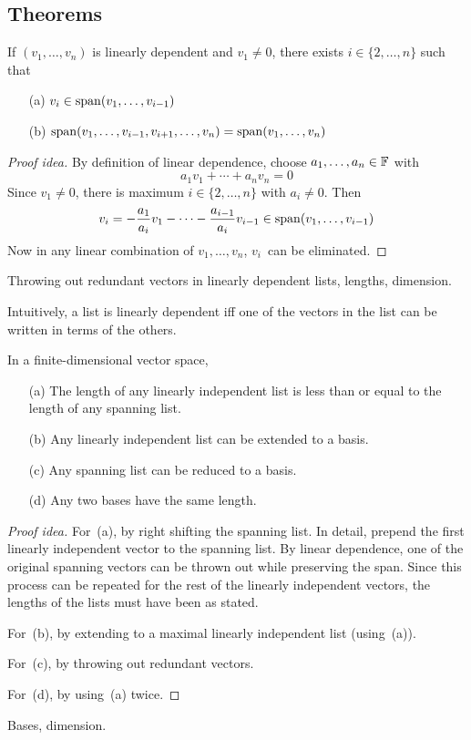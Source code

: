 \subsection*{Theorems}
\begin{thm}
If \((v_1,\ldots,v_n)\) is linearly dependent and \(v_1\ne0\), there exists \(i\in\{2,\ldots,n\}\) such that
\begin{enumerate}[itemsep=0pt]
\item[(a)] \(v_i\in\operatorname{span}(v_1,\ldots,v_{i-1})\)
\item[(b)] \(\operatorname{span}(v_1,\ldots,v_{i-1},v_{i+1},\ldots,v_n)=\operatorname{span}(v_1,\ldots,v_n)\)
\end{enumerate}
\end{thm}
\begin{proof}[Proof idea]
By definition of linear dependence, choose \(a_1,\ldots,a_n\in\mathbb{F}\) with
\[a_1v_1+\cdots+a_nv_n=0\]
Since \(v_1\ne0\), there is maximum \(i\in\{2,\ldots,n\}\) with \(a_i\ne0\). Then
\[v_i=-\frac{a_1}{a_i}v_1-\cdots-\frac{a_{i-1}}{a_i}v_{i-1}\in\operatorname{span}(v_1,\ldots,v_{i-1})\]
Now in any linear combination of \(v_1,\ldots,v_n\), \(v_i\)~can be eliminated.
\end{proof}
\begin{app}
Throwing out redundant vectors in linearly dependent lists, lengths, dimension.
\end{app}
\begin{rmk}
Intuitively, a list is linearly dependent iff one of the vectors in the list can be written in terms of the others.
\end{rmk}

\begin{thm}[Lengths]
In a finite-dimensional vector space,
\begin{enumerate}[itemsep=0pt]
\item[(a)] The length of any linearly independent list is less than or equal to the length of any spanning list.
\item[(b)] Any linearly independent list can be extended to a basis.
\item[(c)] Any spanning list can be reduced to a basis.
\item[(d)] Any two bases have the same length.
\end{enumerate}
\end{thm}
\begin{proof}[Proof idea]
For~(a), by right shifting the spanning list. In detail, prepend the first linearly independent vector to the spanning list. By linear dependence, one of the original spanning vectors can be thrown out while preserving the span. Since this process can be repeated for the rest of the linearly independent vectors, the lengths of the lists must have been as stated.

For~(b), by extending to a maximal linearly independent list (using~(a)).

For~(c), by throwing out redundant vectors.

For~(d), by using~(a) twice.
\end{proof}
\begin{app}
Bases, dimension.
\end{app}

